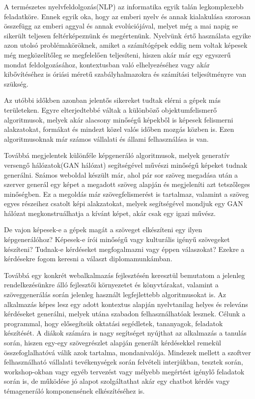 
A természetes nyelvfeldolgozás(NLP) az informatika egyik talán legkomplexebb feladatköre. Ennek egyik oka, hogy az emberi nyelv és annak kialakulása szorosan összefügg az emberi aggyal és annak evolúciójával, melyet még a mai napig se sikerült teljesen feltérképeznünk és megértenünk. Nyelvünk értő használata egyike azon utolsó problémaköröknek, amiket a számítógépek eddig nem voltak képesek még megközelítőleg se megfelelően teljesíteni, hiszen akár már egy egyszerű mondat feldolgozásához, kontextusban való elhelyezéséhez vagy akár kibővítéséhez is óriási méretű szabályhalmazokra és számítási teljesítményre van szükség. 

Az utóbbi időkben azonban jelentős sikereket tudtak elérni a gépek más területeken. Egyre elterjedtebbé váltak a különböző objektumfelismerő algoritmusok, melyek akár alacsony minőségű képekből is képesek felismerni alakzatokat, formákat és mindezt közel valós időben mozgás közben is. Ezen algoritmusoknak már számos vállalati és állami felhasználása is van. 

Továbbá megjelentek különféle képgeneráló algoritmusok, melyek generatív versengő hálózatok(GAN hálózat) segítségével művészi minőségű képeket tudnak generálni. Számos weboldal készült már, ahol pár sor szöveg megadása után a szerver generál egy képet a megadott szöveg alapján és megjeleníti azt tetszőleges minőségben. Ez a megoldás már szövegfelismerést is tartalmaz, valamint a szöveg egyes részeihez csatolt képi alakzatokat, melyek segítségével mondjuk egy GAN hálózat megkonstruálhatja a kívánt képet, akár csak egy igazi művész.

De vajon képesek-e a gépek magát a szöveget elkészíteni egy ilyen képgenerálóhoz? Képesek-e írói minőségű vagy kulturális igényű szövegeket készíteni? Tudnak-e kérdéseket megfogalmazni vagy éppen válaszokat? Ezekre a kérdésekre fogom keresni a választ diplomamunkámban. 

Továbbá egy konkrét webalkalmazás fejlesztésén keresztül bemutatom a jelenleg rendelkezésünkre álló fejlesztői környezetet és könyvtárakat, valamint a szöveggenerálás során jelenleg használt legfejlettebb algoritmusokat is. Az alkalmazás képes lesz egy adott kontextus alapján nyelvtanilag helyes és releváns kérdéseket generálni, melyek utána szabadon felhasználhatóak lesznek. Célunk a programmal, hogy elősegítsük oktatási segédletek, tananyagok, feladatok készítését. A diákok számára is nagy segítséget nyújthat az alkalmazás a tanulás során, hiszen egy-egy szövegrészlet alapján generált kérdésekkel remekül összefoglalhatóvá válik azok tartalma, mondanivalója. Mindezek mellett a szoftver felhasználható vállalati tevékenységek során felvételi interjúkban, tesztek során, workshop-okban vagy egyéb tervezést vagy mélyebb megértést igénylő feladatok során is, de működése jó alapot szolgáltathat akár egy chatbot kérdés vagy témageneráló komponensének elkészítéséhez is.






